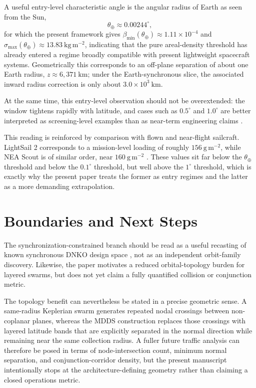 \documentclass[11pt]{article}
\begin{document}
A useful entry-level characteristic angle is the angular radius of Earth as seen from the Sun,
\[
\theta_\oplus \approx 0.00244^\circ,
\]
for which the present framework gives $\beta_{\min}(\theta_\oplus)\approx 1.11\times10^{-4}$ and
$\sigma_{\max}(\theta_\oplus)\approx 13.83\ \mathrm{kg\,m^{-2}}$, indicating that the pure areal-density
threshold has already entered a regime broadly compatible with present lightweight spacecraft systems.
Geometrically this corresponds to an off-plane separation of about one Earth radius,
$z \approx 6{,}371\ \mathrm{km}$; under the Earth-synchronous slice, the associated inward
radius correction is only about $3.0\times10^3\ \mathrm{km}$.

At the same time, this entry-level observation should not be overextended: the window tightens
rapidly with latitude, and cases such as $0.5^\circ$ and $1.0^\circ$ are better interpreted
as screening-level examples than as near-term engineering claims \cite{macdonald2011applications,mansell2023lightsail2}.

This reading is reinforced by comparison with flown and near-flight sailcraft. LightSail 2
corresponds to a mission-level loading of roughly $156\ \mathrm{g\,m^{-2}}$, while NEA Scout is
of similar order, near $160\ \mathrm{g\,m^{-2}}$ \cite{mansell2023lightsail2,johnson2017neascout}.
These values sit far below the $\theta_\oplus$ threshold and below the $0.1^\circ$ threshold,
but well above the $1^\circ$ threshold, which is exactly why the present paper treats the
former as entry regimes and the latter as a more demanding extrapolation.

\section{Boundaries and Next Steps}

The synchronization-constrained branch should be read as a useful recasting of known
synchronous DNKO design space \cite{heiligers2015earthfollowing,quarta2020earthsync,bassetto2024marssync},
not as an independent orbit-family discovery. Likewise, the paper motivates a reduced
orbital-topology burden for layered swarms, but does not yet claim a fully quantified
collision or conjunction metric.

The topology benefit can nevertheless be stated in a precise geometric sense. A same-radius
Keplerian swarm generates repeated nodal crossings between non-coplanar planes, whereas the
MDDS construction replaces those crossings with layered latitude bands that are explicitly
separated in the normal direction while remaining near the same collection radius. A fuller
future traffic analysis can therefore be posed in terms of node-intersection count, minimum
normal separation, and conjunction-corridor density, but the present manuscript intentionally
stops at the architecture-defining geometry rather than claiming a closed operations metric.
\end{document}
